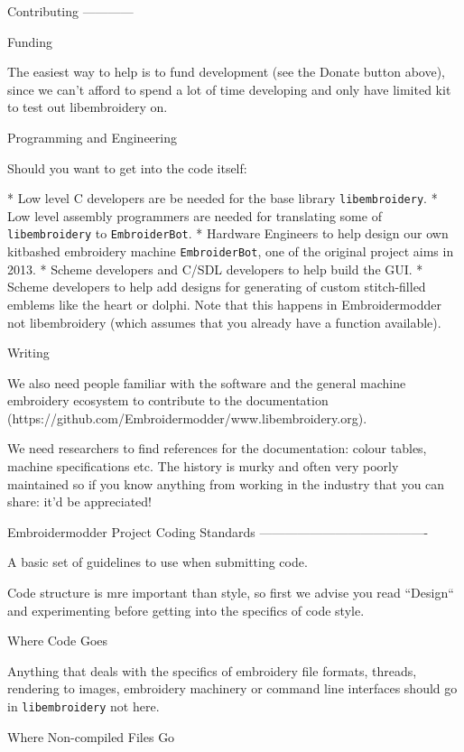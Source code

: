 \documentclass[a4paper]{report}
\begin{document}
{{{{{{{Contributing
------------

Funding
~~~~~~~

The easiest way to help is to fund development (see the Donate button above),
since we can't afford to spend a lot of time developing and only have limited
kit to test out libembroidery on.

Programming and Engineering
~~~~~~~~~~~~~~~~~~~~~~~~~~~

Should you want to get into the code itself:

* Low level C developers are be needed for the base library \texttt{libembroidery}.
* Low level assembly programmers are needed for translating some of \texttt{libembroidery} to \texttt{EmbroiderBot}.
* Hardware Engineers to help design our own kitbashed embroidery machine \texttt{EmbroiderBot}, one of the original project aims in 2013.
* Scheme developers and C/SDL developers to help build the GUI.
* Scheme developers to help add designs for generating of custom stitch-filled emblems like the heart or dolphi. Note that this happens in Embroidermodder not libembroidery (which assumes that you already have a function available).

Writing
~~~~~~~

We also need people familiar with the software and the general
machine embroidery ecosystem to contribute to the
documentation (https://github.com/Embroidermodder/www.libembroidery.org).

We need researchers to find references for the documentation: colour tables,
machine specifications etc. The history is murky and often very poorly maintained
so if you know anything from working in the industry that you can share: it'd be
appreciated!

Embroidermodder Project Coding Standards
----------------------------------------

A basic set of guidelines to use when submitting code.

Code structure is mre important than style, so first we advise you read
``Design`` and experimenting before getting into the specifics of code style.

Where Code Goes
~~~~~~~~~~~~~~~

Anything that deals with the specifics of embroidery file formats, threads,
rendering to images, embroidery machinery or command line interfaces should go 
in \texttt{libembroidery} not here.

Where Non-compiled Files Go
~~~~~~~~~~~~~~~~~~~~~~~~~~~

}}}}}}}
\end{document}
